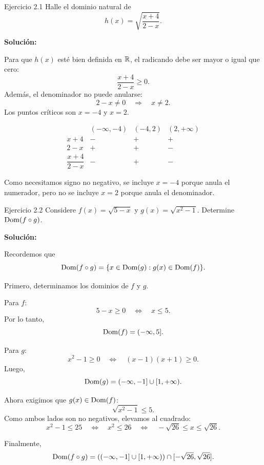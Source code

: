 \documentclass[letterpaper, 12pt]{article}
\begin{document}

\begin{solucionbox}{Ejercicio 2.1}
Halle el dominio natural de
\[
    h(x)=\sqrt{\frac{x+4}{2-x}}.
\]

\textbf{Soluci\'on:}

Para que $h(x)$ est\'e bien definida en $\mathbb{R}$, el radicando debe ser mayor o igual que cero:
\[
    \frac{x+4}{2-x}\geq 0.
\]
Adem\'as, el denominador no puede anularse:
\[
    2-x\neq 0
    \quad\Longrightarrow\quad
    x\neq 2.
\]
Los puntos cr\'iticos son $x=-4$ y $x=2$.

\[
\begin{array}{c|ccc}
    & (-\infty,-4) & (-4,2) & (2,+\infty) \\ \hline
    x+4 & - & + & + \\
    2-x & + & + & - \\ \hline
    \dfrac{x+4}{2-x} & - & + & -
\end{array}
\]

Como necesitamos signo no negativo, se incluye $x=-4$ porque anula el numerador, pero no se incluye $x=2$ porque anula el denominador.

\respuesta{$\Dom(h)=[-4,2)$.}
\end{solucionbox}

\begin{solucionbox}{Ejercicio 2.2}
Considere $f(x)=\sqrt{5-x}$ y $g(x)=\sqrt{x^2-1}$. Determine $\operatorname{Dom}(f\circ g)$.

\textbf{Soluci\'on:}

Recordemos que
\[
    \operatorname{Dom}(f\circ g)=\{x\in\operatorname{Dom}(g):g(x)\in\operatorname{Dom}(f)\}.
\]

Primero, determinamos los dominios de $f$ y $g$.

Para $f$:
\[
    5-x\geq 0
    \quad\Longleftrightarrow\quad
    x\leq 5.
\]
Por lo tanto,
\[
    \operatorname{Dom}(f)=(-\infty,5].
\]

Para $g$:
\[
    x^2-1\geq 0
    \quad\Longleftrightarrow\quad
    (x-1)(x+1)\geq 0.
\]
Luego,
\[
    \operatorname{Dom}(g)=(-\infty,-1]\cup[1,+\infty).
\]

Ahora exigimos que $g(x)\in\operatorname{Dom}(f)$:
\[
    \sqrt{x^2-1}\leq 5.
\]
Como ambos lados son no negativos, elevamos al cuadrado:
\[
    x^2-1\leq 25
    \quad\Longleftrightarrow\quad
    x^2\leq 26
    \quad\Longleftrightarrow\quad
    -\sqrt{26}\leq x\leq \sqrt{26}.
\]

Finalmente,
\[
    \operatorname{Dom}(f\circ g)=
    \left((-\infty,-1]\cup[1,+\infty)\right)
    \cap[-\sqrt{26},\sqrt{26}].
\]

\end{solucionbox}
\end{document}
